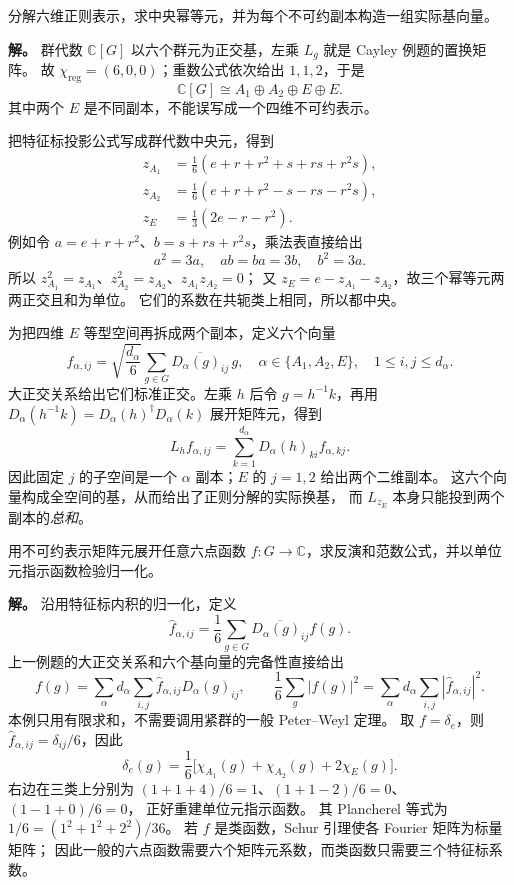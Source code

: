\begin{workedexample}
\label{ex:d3-comprehensive-regular}
分解六维正则表示，求中央幂等元，并为每个不可约副本构造一组实际基向量。

\textbf{解。} 群代数 $\mathbb C[G]$ 以六个群元为正交基，左乘 $L_g$ 就是 Cayley 例题的置换矩阵。
故 $\chi_{\mathrm{reg}}=(6,0,0)$；重数公式依次给出 $1,1,2$，于是
\[
\mathbb C[G]\cong A_1\oplus A_2\oplus E\oplus E.
\]
其中两个 $E$ 是不同副本，不能误写成一个四维不可约表示。

把特征标投影公式写成群代数中央元，得到
\begin{align*}
z_{A_1}&=\frac16(e+r+r^2+s+rs+r^2s),\\
z_{A_2}&=\frac16(e+r+r^2-s-rs-r^2s),\\
z_E&=\frac13(2e-r-r^2).
\end{align*}
例如令 $a=e+r+r^2$、$b=s+rs+r^2s$，乘法表直接给出
\[
a^2=3a,\quad ab=ba=3b,\quad b^2=3a.
\]
所以 $z_{A_1}^2=z_{A_1}$、$z_{A_2}^2=z_{A_2}$、$z_{A_1}z_{A_2}=0$；
又 $z_E=e-z_{A_1}-z_{A_2}$，故三个幂等元两两正交且和为单位。
它们的系数在共轭类上相同，所以都中央。

为把四维 $E$ 等型空间再拆成两个副本，定义六个向量
\[
f_{\alpha,ij}=\sqrt{\frac{d_\alpha}{6}}
\sum_{g\in G}\overline{D_\alpha(g)_{ij}}\,g,
\quad \alpha\in\{A_1,A_2,E\},\quad1\le i,j\le d_\alpha.
\]
大正交关系给出它们标准正交。左乘 $h$ 后令 $g=h^{-1}k$，再用
$D_\alpha(h^{-1}k)=D_\alpha(h)^\dagger D_\alpha(k)$ 展开矩阵元，得到
\[
L_h f_{\alpha,ij}=\sum_{k=1}^{d_\alpha}
D_\alpha(h)_{ki}f_{\alpha,kj}.
\]
因此固定 $j$ 的子空间是一个 $\alpha$ 副本；$E$ 的 $j=1,2$ 给出两个二维副本。
这六个向量构成全空间的基，从而给出了正则分解的实际换基，
而 $L_{z_E}$ 本身只能投到两个副本的\emph{总和}。
\end{workedexample}

\begin{workedexample}
\label{ex:d3-comprehensive-fourier}
用不可约表示矩阵元展开任意六点函数 $f:G\to\mathbb C$，求反演和范数公式，并以单位元指示函数检验归一化。

\textbf{解。} 沿用特征标内积的归一化，定义
\[
\widehat f_{\alpha,ij}=\frac16\sum_{g\in G}
\overline{D_\alpha(g)_{ij}}f(g).
\]
上一例题的大正交关系和六个基向量的完备性直接给出
\[
f(g)=\sum_\alpha d_\alpha\sum_{i,j}
\widehat f_{\alpha,ij}D_\alpha(g)_{ij},\qquad
\frac16\sum_g|f(g)|^2
=\sum_\alpha d_\alpha\sum_{i,j}|\widehat f_{\alpha,ij}|^2.
\]
本例只用有限求和，不需要调用紧群的一般 Peter--Weyl 定理。
取 $f=\delta_e$，则 $\widehat f_{\alpha,ij}=\delta_{ij}/6$，因此
\[
\delta_e(g)=\frac16\bigl[\chi_{A_1}(g)+\chi_{A_2}(g)+2\chi_E(g)\bigr].
\]
右边在三类上分别为 $(1+1+4)/6=1$、$(1+1-2)/6=0$、$(1-1+0)/6=0$，
正好重建单位元指示函数。
其 Plancherel 等式为 $1/6=(1^2+1^2+2^2)/36$。
若 $f$ 是类函数，Schur 引理使各 Fourier 矩阵为标量矩阵；
因此一般的六点函数需要六个矩阵元系数，而类函数只需要三个特征标系数。
\end{workedexample}


